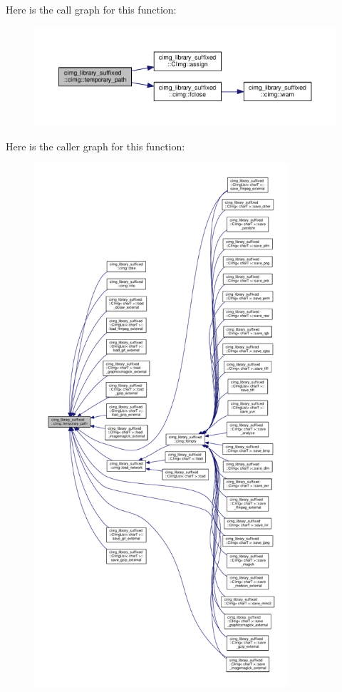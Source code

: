 Here is the call graph for this function\+:
\nopagebreak
\begin{figure}[H]
\begin{center}
\leavevmode
\includegraphics[width=350pt]{d4/d9b/namespacecimg__library__suffixed_1_1cimg_ae9af8e17db04e875db3b45cbe58892d6_cgraph}
\end{center}
\end{figure}
Here is the caller graph for this function\+:
\nopagebreak
\begin{figure}[H]
\begin{center}
\leavevmode
\includegraphics[height=550pt]{d4/d9b/namespacecimg__library__suffixed_1_1cimg_ae9af8e17db04e875db3b45cbe58892d6_icgraph}
\end{center}
\end{figure}
\mbox{\label{namespacecimg__library__suffixed_1_1cimg_a5bd41788a0caabcc16754f18b3454321}} 
